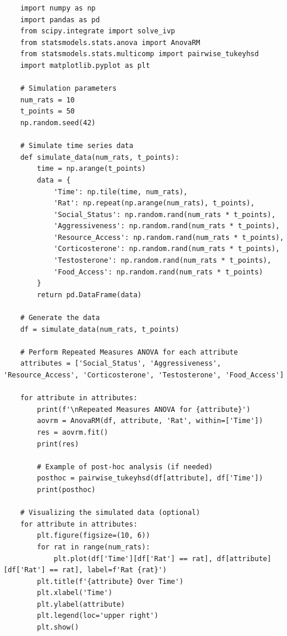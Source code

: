 \documentclass[english, a4paper, 11pt]{article}
\begin{document}
\begin{lstlisting}
    import numpy as np
    import pandas as pd
    from scipy.integrate import solve_ivp
    from statsmodels.stats.anova import AnovaRM
    from statsmodels.stats.multicomp import pairwise_tukeyhsd
    import matplotlib.pyplot as plt
    
    # Simulation parameters
    num_rats = 10
    t_points = 50
    np.random.seed(42)
    
    # Simulate time series data
    def simulate_data(num_rats, t_points):
        time = np.arange(t_points)
        data = {
            'Time': np.tile(time, num_rats),
            'Rat': np.repeat(np.arange(num_rats), t_points),
            'Social_Status': np.random.rand(num_rats * t_points),
            'Aggressiveness': np.random.rand(num_rats * t_points),
            'Resource_Access': np.random.rand(num_rats * t_points),
            'Corticosterone': np.random.rand(num_rats * t_points),
            'Testosterone': np.random.rand(num_rats * t_points),
            'Food_Access': np.random.rand(num_rats * t_points)
        }
        return pd.DataFrame(data)
    
    # Generate the data
    df = simulate_data(num_rats, t_points)
    
    # Perform Repeated Measures ANOVA for each attribute
    attributes = ['Social_Status', 'Aggressiveness', 'Resource_Access', 'Corticosterone', 'Testosterone', 'Food_Access']
    
    for attribute in attributes:
        print(f'\nRepeated Measures ANOVA for {attribute}')
        aovrm = AnovaRM(df, attribute, 'Rat', within=['Time'])
        res = aovrm.fit()
        print(res)
    
        # Example of post-hoc analysis (if needed)
        posthoc = pairwise_tukeyhsd(df[attribute], df['Time'])
        print(posthoc)
    
    # Visualizing the simulated data (optional)
    for attribute in attributes:
        plt.figure(figsize=(10, 6))
        for rat in range(num_rats):
            plt.plot(df['Time'][df['Rat'] == rat], df[attribute][df['Rat'] == rat], label=f'Rat {rat}')
        plt.title(f'{attribute} Over Time')
        plt.xlabel('Time')
        plt.ylabel(attribute)
        plt.legend(loc='upper right')
        plt.show()
    
\end{lstlisting}
\end{document}
